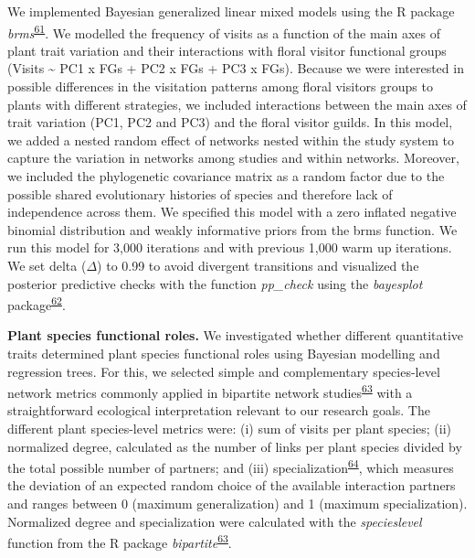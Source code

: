 \documentclass[12pt,a4paper,]{article}
\begin{document}
We implemented Bayesian generalized linear mixed models using the R
package
\emph{brms}\textsuperscript{\protect\hyperlink{ref-burkner2017}{61}}. We
modelled the frequency of visits as a function of the main axes of plant
trait variation and their interactions with floral visitor functional
groups (Visits \textasciitilde{} PC1 x FGs + PC2 x FGs + PC3 x FGs).
Because we were interested in possible differences in the visitation
patterns among floral visitors groups to plants with different
strategies, we included interactions between the main axes of trait
variation (PC1, PC2 and PC3) and the floral visitor guilds. In this
model, we added a nested random effect of networks nested within the
study system to capture the variation in networks among studies and
within networks. Moreover, we included the phylogenetic covariance
matrix as a random factor due to the possible shared evolutionary
histories of species and therefore lack of independence across them. We
specified this model with a zero inflated negative binomial distribution
and weakly informative priors from the brms function. We run this model
for 3,000 iterations and with previous 1,000 warm up iterations. We set
delta (\(\Delta\)) to 0.99 to avoid divergent transitions and visualized
the posterior predictive checks with the function \emph{pp\_check} using
the \emph{bayesplot}
package\textsuperscript{\protect\hyperlink{ref-gabry2019}{62}}.

\textbf{Plant species functional roles.} We investigated whether
different quantitative traits determined plant species functional roles
using Bayesian modelling and regression trees. For this, we selected
simple and complementary species-level network metrics commonly applied
in bipartite network
studies\textsuperscript{\protect\hyperlink{ref-dormann2008}{63}} with a
straightforward ecological interpretation relevant to our research
goals. The different plant species-level metrics were: (i) sum of visits
per plant species; (ii) normalized degree, calculated as the number of
links per plant species divided by the total possible number of
partners; and (iii)
specialization\textsuperscript{\protect\hyperlink{ref-bluthgen2006}{64}},
which measures the deviation of an expected random choice of the
available interaction partners and ranges between 0 (maximum
generalization) and 1 (maximum specialization). Normalized degree and
specialization were calculated with the \emph{specieslevel} function
from the R package
\emph{bipartite}\textsuperscript{\protect\hyperlink{ref-dormann2008}{63}}.
\end{document}
